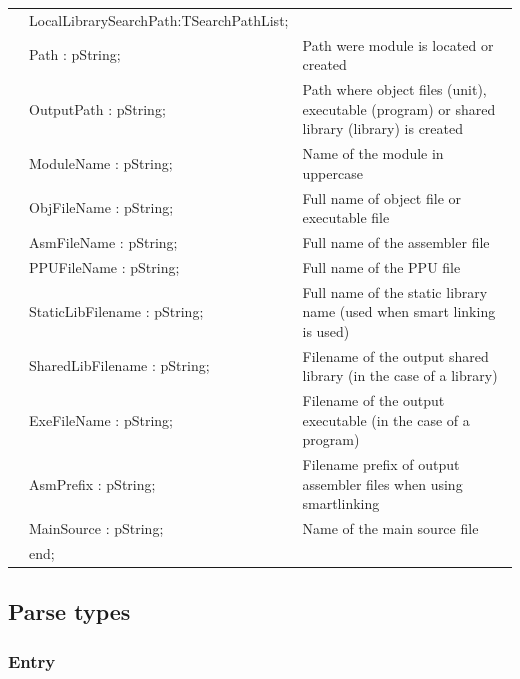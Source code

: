 \documentclass [a4paper,12pt]{article}
\begin{document}
\begin{longtable}{|l@{\extracolsep{\fill}}lp{6cm}|}
&\textsf{LocalLibrarySearchPath:TSearchPathList;}&  \\
&\textsf{Path : pString;}& Path were module is located or created \\
&\textsf{OutputPath : pString;}& Path where object files (unit), executable (program) or shared library (library) is created \\
&\textsf{ModuleName : pString;}& Name of the module in uppercase \\
&\textsf{ObjFileName : pString;}& Full name of object file or executable file \\
&\textsf{AsmFileName : pString;}& Full name of the assembler file \\
&\textsf{PPUFileName : pString;}& Full name of the PPU file \\
&\textsf{StaticLibFilename : pString;}& Full name of the static library name (used when smart linking is used) \\
&\textsf{SharedLibFilename : pString;}& Filename of the output shared library (in the case of a library) \\
&\textsf{ExeFileName : pString;}& Filename of the output executable (in the case of a program) \\
&\textsf{AsmPrefix : pString;}& Filename prefix of output assembler files when using smartlinking \\
&\textsf{MainSource : pString;}& Name of the main source file \\
&\textsf{end;}& \\
\end{longtable}

\subsection{Parse types}
\label{subsec:parse}

\subsubsection{Entry}
\label{subsubsec:entry}
\end{document}
